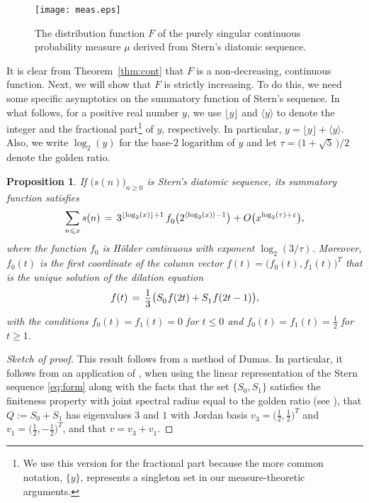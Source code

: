 \documentclass[11pt,a4paper]{amsart}
\theoremstyle{plain}
\newtheorem{prop}[theorem]{Proposition}
\theoremstyle{definition}
\numberwithin{equation}{section}
\newcommand{\ts}{\hspace{0.5pt}}
\newcommand{\myfrac}[2]{\frac{\raisebox{-2pt}{$#1$}}
      {\raisebox{0.5pt}{$#2$}}}
\begin{document}
\begin{figure}
  \texttt{[image: meas.eps]}
  \caption{The distribution function $F$ of the purely singular
    continuous probability measure $\mu$ derived from Stern's
    diatomic sequence.\label{fig:dist}}
\end{figure}

It is clear from Theorem~\ref{thm:cont}
that $F$ is a non-decreasing, continuous function. Next,
we will show that $F$ is strictly increasing. To do this, we need some
specific asymptotics on the summatory function of Stern's sequence. In
what follows, for a positive real number $y$, we use
$\lfloor y\rfloor$ and $\langle y \rangle$ 
to denote the integer and the fractional part\footnote{We use this
  version for the fractional part because the more common notation,
  $\{ y \}$, represents a singleton set in our measure-theoretic 
  arguments.} of $y$, respectively. In particular,
$y=\lfloor y\rfloor+\langle y \rangle$. Also, we write $\log_2 (y)$
for the base-$2$ logarithm of $y$ and let
$\tau=\bigl(1+\sqrt{5}\, \bigr)/2$ denote the golden ratio.

\begin{prop}\label{prop:s} 
  If\/ $\bigl(s(n)\bigr)_{n\geqslant 0}$ is Stern's diatomic sequence, its
  summatory function satisfies
\[
   \sum_{n\leqslant x} s(n) \, = \, 3^{\lfloor \log_2 (x)\rfloor+1} \,
    f^{}_{0} \big( 2^{\langle \log_2 (x) \rangle - 1} \big)\ts + 
    O\big(x^{\log_2 (\tau) + \ts \varepsilon}\big),
\]
where the function\/ $f^{}_{0} $ is H\"older continuous with
exponent\/ $\log_2(3/\tau)$. Moreover, $f^{}_0 (t)$ is the first
coordinate of the column vector\/
${f}(t)= \bigl(f^{}_0(t) , f^{}_1(t)\bigr)^T$ that is the unique
solution of the dilation equation
\[
   {f}(t) \, = \, \myfrac{1}{3}\ts \bigl(
   {S}^{}_{0} \ts {f}(2t) + {S}^{}_{1} \ts {f}(2t-1)\bigr) ,
\]
with the conditions\/ $f^{}_0 (t) = f^{}_1 (t) = 0$ for\/
$t\leqslant 0$ and\/ $f^{}_0 (t) = f^{}_1 (t) = \frac{1}{2}$ for\/
$t\geqslant 1$.
\end{prop}

\begin{proof}[Sketch of proof]
  This result follows from a method of Dumas. In particular, it
  follows from an application of \cite[Thm.~3]{D2013}, when using the
  linear representation of the Stern sequence \eqref{eq:form} along
  with the facts that the set $\{{S}^{}_0 , {S}^{}_1\}$ satisfies
  the finiteness property with joint spectral radius equal to the
  golden ratio (see \cite{CIJFCS,CT2014}), that
  ${Q} := {S}^{}_0 + {S}^{}_1$ has eigenvalues $3$ and $1$ with
  Jordan basis
  ${v}^{}_{3} = \bigl(\frac{1}{2}, \frac{1}{2}\bigr)^T$ and
  ${v}^{}_{1} = \bigl( \frac{1}{2}, -\frac{1}{2} \bigr)^T$, and
  that ${v} = {v}^{}_{3} + {v}^{}_{1}$.
\end{proof}
\end{document}
